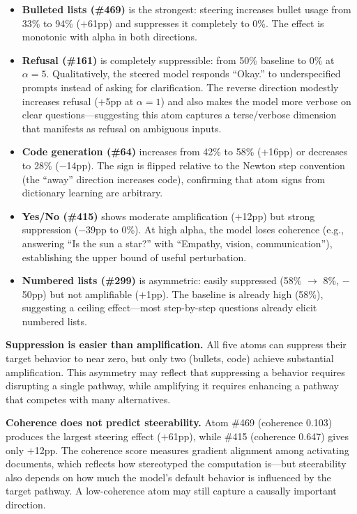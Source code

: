 \documentclass{article} %
\begin{document}
\begin{itemize}
\item \textbf{Bulleted lists (\#469)} is the strongest: steering increases bullet usage from 33\% to 94\% ($+$61pp) and suppresses it completely to 0\%. The effect is monotonic with alpha in both directions.

\item \textbf{Refusal (\#161)} is completely suppressible: from 50\% baseline to 0\% at $\alpha = 5$. Qualitatively, the steered model responds ``Okay.'' to underspecified prompts instead of asking for clarification. The reverse direction modestly increases refusal ($+$5pp at $\alpha = 1$) and also makes the model more verbose on clear questions---suggesting this atom captures a terse/verbose dimension that manifests as refusal on ambiguous inputs.

\item \textbf{Code generation (\#64)} increases from 42\% to 58\% ($+$16pp) or decreases to 28\% ($-$14pp). The sign is flipped relative to the Newton step convention (the ``away'' direction increases code), confirming that atom signs from dictionary learning are arbitrary.

\item \textbf{Yes/No (\#415)} shows moderate amplification ($+$12pp) but strong suppression ($-$39pp to 0\%). At high alpha, the model loses coherence (e.g., answering ``Is the sun a star?'' with ``Empathy, vision, communication''), establishing the upper bound of useful perturbation.

\item \textbf{Numbered lists (\#299)} is asymmetric: easily suppressed (58\% $\to$ 8\%, $-$50pp) but not amplifiable ($+$1pp). The baseline is already high (58\%), suggesting a ceiling effect---most step-by-step questions already elicit numbered lists.
\end{itemize}

\textbf{Suppression is easier than amplification.} All five atoms can suppress their target behavior to near zero, but only two (bullets, code) achieve substantial amplification. This asymmetry may reflect that suppressing a behavior requires disrupting a single pathway, while amplifying it requires enhancing a pathway that competes with many alternatives.

\textbf{Coherence does not predict steerability.} Atom \#469 (coherence 0.103) produces the largest steering effect ($+$61pp), while \#415 (coherence 0.647) gives only $+$12pp. The coherence score measures gradient alignment among activating documents, which reflects how stereotyped the computation is---but steerability also depends on how much the model's default behavior is influenced by the target pathway. A low-coherence atom may still capture a causally important direction.
\end{document}
